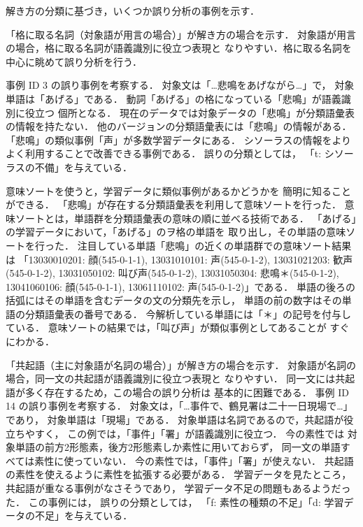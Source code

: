 \documentclass[japanese]{jnlp_1.4}
\begin{document}
解き方の分類に基づき，いくつか誤り分析の事例を示す．

「格に取る名詞（対象語が用言の場合）」が解き方の場合を示す．
対象語が用言の場合，格に取る名詞が語義識別に役立つ表現と
なりやすい\cite{Murata_murata_s2j_nlp2003_new}．格に取る名詞を中心に眺めて誤り分析を行う．

事例 ID 3 の誤り事例を考察する．
対象文は「…悲鳴をあげながら…」で，
対象単語は「あげる」である．
動詞「あげる」の格になっている「悲鳴」が語義識別に役立つ
個所となる．
現在のデータでは対象データの「悲鳴」が分類語彙表の情報を持たない．
他のバージョンの分類語彙表には「悲鳴」の情報がある．
「悲鳴」の類似事例「声」が多数学習データにある．
シソーラスの情報をよりよく利用することで改善できる事例である．
誤りの分類としては，
「t: シソーラスの不備」を与えている．

意味ソート\cite{murata_msort_nlp}を使うと，学習データに類似事例があるかどうかを
簡明に知ることができる．
「悲鳴」が存在する分類語彙表を利用して意味ソートを行った．
意味ソートとは，単語群を分類語彙表の意味の順に並べる技術である．
「あげる」の学習データにおいて，「あげる」のヲ格の単語を
取り出し，その単語の意味ソートを行った．
注目している単語「悲鳴」の近くの単語群での意味ソート結果は
「13030010201: 顔(545-0-1-1), 13031010101: 声(545-0-1-2), 13031021203: 歓声(545-0-1-2), 13031050102: 叫び声(545-0-1-2), 13031050304: 悲鳴＊(545-0-1-2), 13041060106: 顔(545-0-1-1), 13061110102: 声(545-0-1-2)」である．
単語の後ろの括弧にはその単語を含むデータの文の分類先を示し，
単語の前の数字はその単語の分類語彙表の番号である．
今解析している単語には「＊」の記号を付与している．
意味ソートの結果では，「叫び声」が類似事例としてあることが
すぐにわかる．

「共起語（主に対象語が名詞の場合）」が解き方の場合を示す．
対象語が名詞の場合，同一文の共起語が語義識別に役立つ表現と
なりやすい\cite{Murata_murata_s2j_nlp2003_new}．
同一文には共起語が多く存在するため，この場合の誤り分析は
基本的に困難である．
事例 ID 14 の誤り事例を考察する．
対象文は，「…事件で、鶴見署は二十一日現場で…」であり，
対象単語は「現場」である．
対象単語は名詞であるので，共起語が役立ちやすく，
この例では，「事件」「署」が語義識別に役立つ．
今の素性では
対象単語の前方2形態素，後方2形態素しか素性に用いておらず，
同一文の単語すべては素性に使っていない．
今の素性では，「事件」「署」が使えない．
共起語の素性を使えるように素性を拡張する必要がある．
学習データを見たところ，共起語が重なる事例がなさそうであり，
学習データ不足の問題もあるようだった．
この事例には，
誤りの分類としては，
「f: 素性の種類の不足」「d: 学習データの不足」を与えている．
\end{document}
